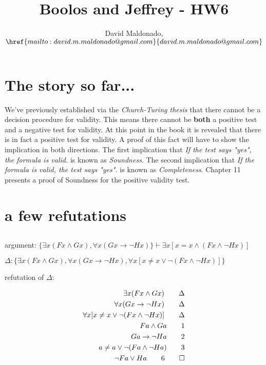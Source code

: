 \documentclass[a4paper,11pt]{article}
\author{David Maldonado, $\href{mailto:david.m.maldonado@gmail.com}%
{david.m.maldonado@gmail.com}$}
\title{Boolos and Jeffrey - HW6}
\begin{document}
\maketitle


\section{The story so far...}

We've previously established via the \textit{Church-Turing thesis} that there cannot 
be a decision procedure for validity. This means there cannot be \textbf{both} a positive test
and a negative test for validity. At this point in the book it is revealed that there is in fact a 
positive test for validity. A proof of this fact will have to show the implication in both directions.
The first implication that \textit{If the test says "yes", the formula is valid.} is known as \textit{Soundness}.
The second implication that \textit{If the formula is valid, the test says "yes".} is known as \textit{Completeness}.
Chapter 11 presents a proof of Soundness for the positive validity test.

\section{a few refutations}


\subsection{}

argument: $ \{ \exists x(Fx \land Gx), \forall x(Gx \rightarrow \lnot Hx) \} \vdash \exists x[x=x \land (Fx \land \lnot Hx)] $

\bigskip

\noindent $\Delta: \{ \exists x(Fx \land Gx), \forall x(Gx \rightarrow \lnot Hx), \forall x[x \neq x \lor \lnot(Fx \land \lnot Hx)] \}$

\bigskip

\noindent refutation of $\Delta:$

\begin{align*} 
  \exists x(Fx \land Gx)        								\tag*{$\Delta$} \\
  \forall x(Gx \rightarrow \lnot Hx)							\tag*{$\Delta$} \\
  \forall x[x \neq x \lor \lnot(Fx \land \lnot Hx)]    		                		\tag*{$\Delta$} \\
  Fa \land Ga       										\tag*{1} \\
  Ga \rightarrow \lnot Ha                                                                       \tag*{2} \\
  a \neq a \lor \lnot(Fa \land \lnot Ha)							\tag*{3} \\
  \lnot Fa \lor Ha										\tag*{6}
  \qedhere
\end{align*}
\end{document}
